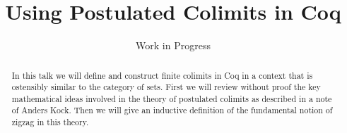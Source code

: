 \message{ !name(talk2018-03-05.tex)}\documentclass{article}
\title{Using Postulated Colimits in Coq}
\author{Work in Progress}
\begin{document}

\maketitle
\begin{abstract}
  In this talk we will define and construct finite colimits in Coq in a context that is ostensibly similar to the category of sets.
  First we will review without proof the key mathematical ideas involved in the theory of postulated colimits as described in a note of Anders Kock.
  Then we will give an inductive definition of the fundamental notion of zigzag in this theory.
\end{abstract}
\tableofcontents






\end{document}
